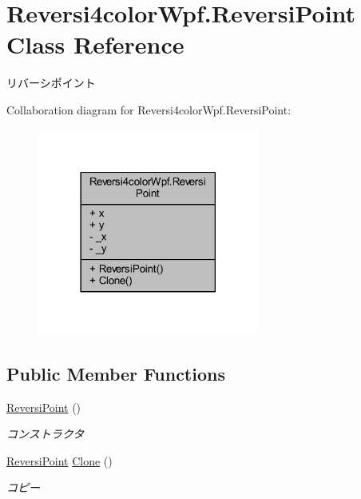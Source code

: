 \hypertarget{class_reversi4color_wpf_1_1_reversi_point}{}\section{Reversi4color\+Wpf.\+Reversi\+Point Class Reference}
\label{class_reversi4color_wpf_1_1_reversi_point}


リバーシポイント  




Collaboration diagram for Reversi4color\+Wpf.\+Reversi\+Point\+:\nopagebreak
\begin{figure}[H]
\begin{center}
\leavevmode
\includegraphics[width=206pt]{class_reversi4color_wpf_1_1_reversi_point__coll__graph}
\end{center}
\end{figure}
\subsection*{Public Member Functions}
\begin{DoxyCompactItemize}
\item 
\hyperlink{class_reversi4color_wpf_1_1_reversi_point_a822291b557aaa185521717e47621bcdd}{Reversi\+Point} ()
\begin{DoxyCompactList}\small\item\em コンストラクタ \end{DoxyCompactList}\item 
\hyperlink{class_reversi4color_wpf_1_1_reversi_point}{Reversi\+Point} \hyperlink{class_reversi4color_wpf_1_1_reversi_point_a2c8e58a48a5199c8ccf3ca72e5517de9}{Clone} ()
\begin{DoxyCompactList}\small\item\em コピー \end{DoxyCompactList}\end{DoxyCompactItemize}
